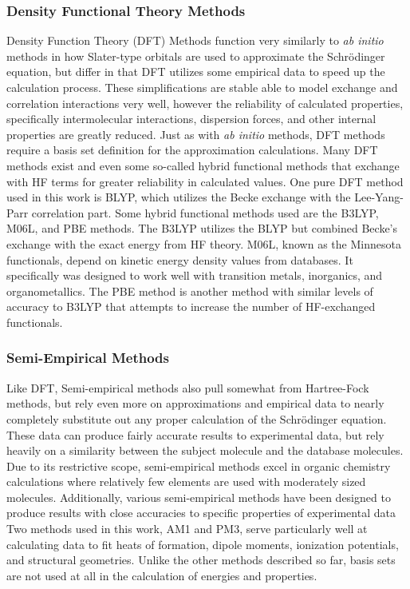 \subsubsection{Density Functional Theory Methods}

Density Function Theory (DFT) Methods function very similarly to \textit{ab initio} methods in how Slater-type orbitals are used to approximate the Schrödinger equation, but differ in that DFT utilizes some empirical data to speed up the calculation process.\cite{DFT}
These simplifications are stable able to model exchange and correlation interactions very well, however the reliability of calculated properties, specifically intermolecular interactions, dispersion forces, and other internal properties are greatly reduced.
Just as with \textit{ab initio} methods, DFT methods require a basis set definition for the approximation calculations.
Many DFT methods exist and even some so-called hybrid functional methods that exchange with HF terms for greater reliability in calculated values.
One pure DFT method used in this work is BLYP, which utilizes  the Becke exchange with the Lee-Yang-Parr correlation part.
Some hybrid functional methods used are the B3LYP, M06L, and PBE methods.
The B3LYP utilizes the BLYP but combined Becke's exchange with the exact energy from HF theory.
M06L, known as the Minnesota functionals, depend on kinetic energy density values from databases.
It specifically was designed to work well with transition metals, inorganics, and organometallics.\cite{M06L}
The PBE method is another method with similar levels of accuracy to B3LYP that attempts to increase the number of HF-exchanged functionals.

\subsubsection{Semi-Empirical Methods}

Like DFT, Semi-empirical methods also pull somewhat from Hartree-Fock methods, but rely even more on approximations and empirical data to nearly completely substitute out any proper calculation of the Schrödinger equation.
These data can produce fairly accurate results to experimental data, but rely heavily on a similarity between the subject molecule and the database molecules.
Due to its restrictive scope, semi-empirical methods excel in organic chemistry calculations where relatively few elements are used with moderately sized molecules.\cite{huckel}
Additionally, various semi-empirical methods have been designed to produce results with close accuracies to specific properties of experimental data 
Two methods used in this work, AM1\cite{AM1} and PM3,\cite{PM3} serve particularly well at calculating data to fit heats of formation, dipole moments, ionization potentials, and structural geometries.
Unlike the other methods described so far, basis sets are not used at all in the calculation of energies and properties.


